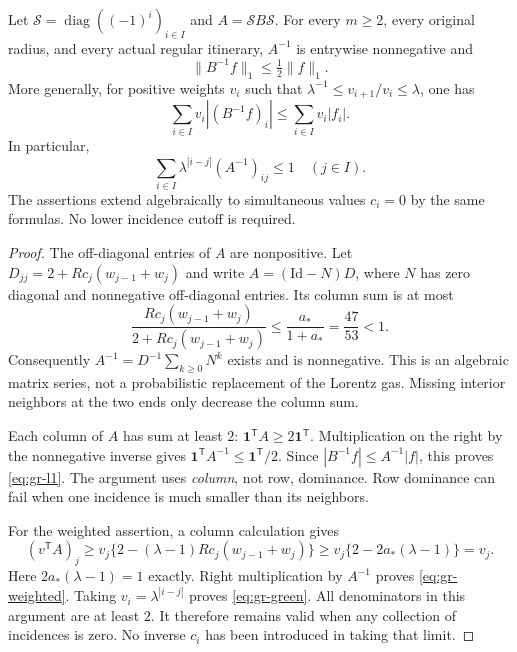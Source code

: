 \begin{theorem}
\label{thm:gr-resolvent}
Let $\mathcal S=\operatorname{diag}((-1)^i)_{i\in I}$ and
$A=\mathcal S B\mathcal S$. For every $m\ge2$, every original radius,
and every actual regular itinerary, $A^{-1}$ is entrywise nonnegative
and
\begin{equation}\label{eq:gr-l1}
 \|B^{-1}f\|_1\le\tfrac12\|f\|_1.
\end{equation}
More generally, for positive weights $v_i$ such that
$\lambda^{-1}\le v_{i+1}/v_i\le\lambda$, one has
\begin{equation}\label{eq:gr-weighted}
 \sum_{i\in I}v_i|(B^{-1}f)_i|
       \le\sum_{i\in I}v_i|f_i|.
\end{equation}
In particular,
\begin{equation}\label{eq:gr-green}
 \sum_{i\in I}\lambda^{|i-j|}(A^{-1})_{ij}\le1
 \quad(j\in I).
\end{equation}
The assertions extend algebraically to simultaneous values
$c_i=0$ by the same formulas. No lower incidence cutoff is required.
\end{theorem}
\begin{proof}
The off-diagonal entries of $A$ are nonpositive. Let
$D_{jj}=2+Rc_j(w_{j-1}+w_j)$ and write $A=(\mathrm{Id}-N)D$,
where $N$ has zero diagonal and nonnegative off-diagonal entries.
Its column sum is at most
\[
 \frac{Rc_j(w_{j-1}+w_j)}{2+Rc_j(w_{j-1}+w_j)}
 \le \frac{a_*}{1+a_*}=\frac{47}{53}<1.
\]
Consequently $A^{-1}=D^{-1}\sum_{k\ge0}N^k$ exists and is
nonnegative. This is an algebraic matrix series, not a probabilistic
replacement of the Lorentz gas. Missing interior neighbors at the two
ends only decrease the column sum.

Each column of $A$ has sum at least $2$:
$\boldsymbol1^{\mathsf T}A\ge2\boldsymbol1^{\mathsf T}$.
Multiplication on the right by the nonnegative inverse gives
$\boldsymbol1^{\mathsf T}A^{-1}\le\boldsymbol1^{\mathsf T}/2$.
Since $|B^{-1}f|\le A^{-1}|f|$, this proves \eqref{eq:gr-l1}.
The argument uses \emph{column}, not row, dominance. Row dominance
can fail when one incidence is much smaller than its neighbors.

For the weighted assertion, a column calculation gives
\[
 (v^{\mathsf T}A)_j
 \ge v_j\{2-(\lambda-1)Rc_j(w_{j-1}+w_j)\}
 \ge v_j\{2-2a_*(\lambda-1)\}=v_j.
\]
Here $2a_*(\lambda-1)=1$ exactly. Right multiplication by $A^{-1}$
proves \eqref{eq:gr-weighted}. Taking $v_i=\lambda^{|i-j|}$ proves
\eqref{eq:gr-green}. All denominators in this argument are at least
$2$. It therefore remains valid when any collection of incidences is
zero. No inverse $c_i$ has been introduced in taking that limit.
\end{proof}

